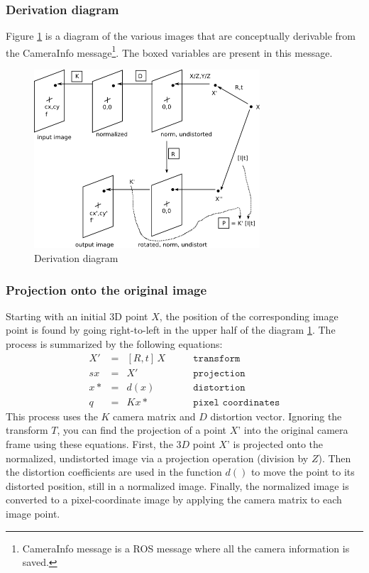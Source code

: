 \subsubsection{Derivation diagram}

Figure \ref{fig:camera_model03} is a diagram of the various images that are conceptually derivable from the CameraInfo message\footnote{CameraInfo message is a ROS message where all the camera information is saved.}. The boxed variables are present in this message.

\begin{figure}[!htbp]
 \centering
 \includegraphics[width=0.75\textwidth]{images/camera_model03.png}
 \caption{Derivation diagram}
 \label{fig:camera_model03}
\end{figure}

\subsubsection{Projection onto the original image}

Starting with an initial 3D point $X$, the position of the corresponding image point is found by going right-to-left in the upper half of the diagram \ref{fig:camera_model03}. The process is summarized by the following equations:
\[
\begin{array}{rcll}
X' &=& [R,t]\,X  & \quad \quad \texttt{transform} \\
sx &=& X'        & \quad \quad \texttt{projection} \\
x* &=& d(x)      & \quad \quad \texttt{distortion} \\
q  &=& Kx*       & \quad \quad \texttt{pixel coordinates}
\end{array}
\]
This process uses the $K$ camera matrix and $D$ distortion vector. Ignoring the transform $T$, you can find the projection of a point $X$' into the original camera frame using these equations. First, the $3D$ point $X$' is projected onto the normalized, undistorted image via a projection operation (division by $Z$). Then the distortion coefficients are used in the function $d()$ to move the point to its distorted position, still in a normalized image. Finally, the normalized image is converted to a pixel-coordinate image by applying the camera matrix to each image point.



